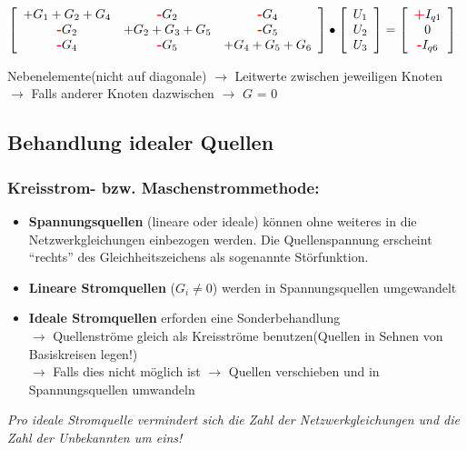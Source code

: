$\left[\begin{array}{ccc}
+G_1+G_2+G_4 &\text{\textbf{\textcolor{red}{-}}}G_2 &\text{\textbf{\textcolor{red}{-}}}G_4\\
\text{\textbf{\textcolor{red}{-}}}G_2 &+G_2+G_3+G_5
&\text{\textbf{\textcolor{red}{-}}}G_5\\ 
\text{\textbf{\textcolor{red}{-}}}G_4 &\text{\textbf{\textcolor{red}{-}}}G_5 &+G_4+G_5+G_6
\end{array}\right] \bullet 
\left[\begin{array}{l}U_1\\U_2\\U_3\end{array}\right] = 
\left[\begin{array}{c}\text{\textbf{\textcolor{red}{+}}}I_{q1}\\0\\
\text{\textbf{\textcolor{red}{-}}}I_{q6}\end{array}\right]$

Nebenelemente(nicht auf diagonale) $\rightarrow$ Leitwerte zwischen jeweiligen Knoten $\rightarrow$ Falls anderer Knoten dazwischen $\rightarrow$ $G$ = 0

\subsection{Behandlung idealer Quellen}
\subsubsection{Kreisstrom- bzw. Maschenstrommethode:}
\begin{itemize}
	\item \textbf{Spannungsquellen} (lineare oder ideale) können ohne weiteres in die Netzwerkgleichungen einbezogen werden. Die Quellenspannung erscheint "`rechts"' des Gleichheitszeichens als sogenannte Störfunktion.
	\item \textbf{Lineare Stromquellen} ($G_{i} \not = 0$) werden in Spannungsquellen umgewandelt
	\item \textbf{Ideale Stromquellen} erforden eine Sonderbehandlung\\ $\rightarrow$ Quellenströme gleich als Kreisströme benutzen(Quellen in Sehnen von Basiskreisen legen!)\\$\rightarrow$ Falls dies nicht möglich ist $\rightarrow$ Quellen verschieben und in Spannungsquellen umwandeln
\end{itemize}
\emph{Pro ideale Stromquelle vermindert sich die Zahl der Netzwerkgleichungen und die Zahl der Unbekannten um eins!}

